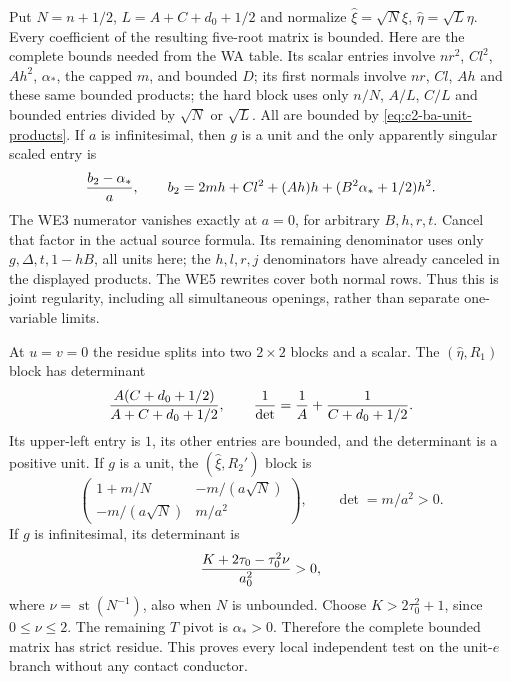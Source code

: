 Put $N=n+1/2$, $L=A+C+d_0+1/2$ and normalize
$\widehat\xi=\sqrt N\xi$, $\widehat\eta=\sqrt L\eta$.
Every coefficient of the resulting five-root matrix is bounded.
Here are the complete bounds needed from the WA table. Its scalar
entries involve $nr^2$, $Cl^2$, $Ah^2$, $\alpha_*$, the capped $m$,
and bounded $D$; its first normals involve $nr$, $Cl$, $Ah$ and these
same bounded products; the hard block uses only $n/N$, $A/L$, $C/L$
and bounded entries divided by $\sqrt N$ or $\sqrt L$. All are bounded
by \eqref{eq:c2-ba-unit-products}. If $a$ is infinitesimal, then $g$
is a unit and the only apparently singular scaled entry is
\begin{equation}
 {b_2-\alpha_*\over a},\qquad
 b_2=2mh+Cl^2+(Ah)h+(B^2\alpha_*+1/2)h^2.
 \label{eq:c2-ba-a-divisibility}
\end{equation}
The WE3 numerator vanishes exactly at $a=0$, for arbitrary
$B,h,r,t$. Cancel that factor in the actual source formula. Its remaining
denominator uses only $g,\Delta,t,1-hB$, all units here; the $h,l,r,j$
denominators have already canceled in the displayed products. The WE5
rewrites cover both normal rows. Thus this is joint regularity, including
all simultaneous openings, rather than separate one-variable limits.

At $u=v=0$ the residue splits into two $2\times2$ blocks and a scalar.
The $(\widehat\eta,R_1)$ block has determinant
\begin{equation}
 {A(C+d_0+1/2)\over A+C+d_0+1/2},\qquad
 {1\over\det}={1\over A}+{1\over C+d_0+1/2}.
 \label{eq:c2-ba-eta-determinant}
\end{equation}
Its upper-left entry is $1$, its other entries are bounded, and the
determinant is a positive unit. If $g$ is a unit, the
$(\widehat\xi,R_2')$ block is
\[
 \begin{pmatrix}
 1+m/N&-m/(a\sqrt N)\\-m/(a\sqrt N)&m/a^2
 \end{pmatrix},\qquad \det=m/a^2>0.
\]
If $g$ is infinitesimal, its determinant is
\[
 {K+2\tau_0-\tau_0^2\nu\over a_0^2}>0,
\]
where $\nu=\operatorname{st}(N^{-1})$, also when $N$ is unbounded.
Choose $K>2\tau_0^2+1$, since $0\le\nu\le2$.
The remaining $T$ pivot is $\alpha_*>0$. Therefore the complete bounded
matrix has strict residue. This proves every local independent test on
the unit-$e$ branch without any contact conductor.

